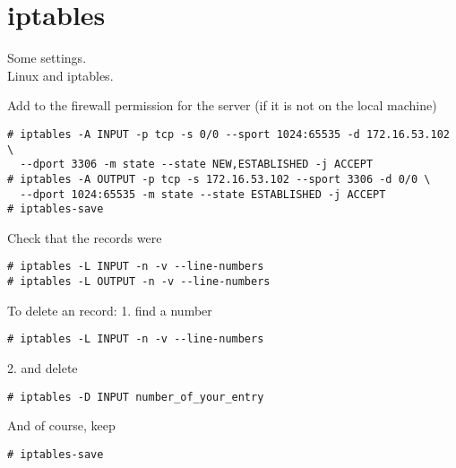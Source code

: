 \section{iptables}
\par
Some settings. \\
Linux and iptables.

\par
Add to the firewall permission for the server (if it is not on the local machine)
\begin{Verbatim}[frame=single]
# iptables -A INPUT -p tcp -s 0/0 --sport 1024:65535 -d 172.16.53.102 \
  --dport 3306 -m state --state NEW,ESTABLISHED -j ACCEPT
# iptables -A OUTPUT -p tcp -s 172.16.53.102 --sport 3306 -d 0/0 \
  --dport 1024:65535 -m state --state ESTABLISHED -j ACCEPT
# iptables-save
\end{Verbatim}


\par
Check that the records were
\begin{Verbatim}[frame=single]
# iptables -L INPUT -n -v --line-numbers
# iptables -L OUTPUT -n -v --line-numbers
\end{Verbatim}

\par
To delete an record:
1. find a number
\begin{Verbatim}[frame=single]
# iptables -L INPUT -n -v --line-numbers
\end{Verbatim}
2. and delete
\begin{Verbatim}[frame=single]
# iptables -D INPUT number_of_your_entry
\end{Verbatim}


\par
And of course, keep
\begin{Verbatim}[frame=single]
# iptables-save
\end{Verbatim}